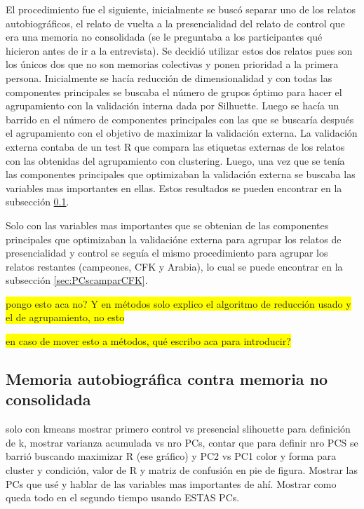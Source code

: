 El procedimiento fue el siguiente, inicialmente se buscó separar uno de los relatos autobiográficos, el relato de vuelta a la presencialidad del relato de control que era una memoria no consolidada (se le preguntaba a los participantes qué hicieron antes de ir a la entrevista). Se decidió utilizar estos dos relatos pues son los únicos dos que no son memorias colectivas y ponen prioridad a la primera persona. 
Inicialmente se hacía reducción de dimensionalidad y con todas las componentes principales se buscaba el número de grupos óptimo para hacer el agrupamiento con la validación interna dada por Silhuette. Luego se hacía un barrido en el número de componentes principales con las que se buscaría después el agrupamiento con el objetivo de maximizar la validación externa. La validación externa contaba de un test R que compara las etiquetas externas de los relatos con las obtenidas del agrupamiento con clustering. Luego, una vez que se tenía las componentes principales que optimizaban la validación externa se buscaba las variables mas importantes en ellas. Estos resultados se pueden encontrar en la subsección \ref{sec:PCspresvscontrol}.

Solo con las variables mas importantes que se obtenian de las componentes principales que optimizaban la validacióne externa para agrupar los relatos de presencialidad y control se seguía el mismo procedimiento para agrupar los relatos restantes (campeones, CFK y Arabia), lo cual se puede encontrar en la subsección \ref{sec:PCscamparCFK}.

\colorbox{yellow}{pongo esto aca no? Y en métodos solo explico el algoritmo de reducción usado y el de agrupamiento, no esto}

\colorbox{yellow}{en caso de mover esto a métodos, qué escribo aca para introducir?}

\subsection{Memoria autobiográfica contra memoria no consolidada}
\label{sec:PCspresvscontrol}
solo con kmeans mostrar 
primero control vs presencial slihouette para definición de k, mostrar varianza acumulada vs nro PCs, contar que para definir nro PCS se barrió buscando maximizar R (ese gráfico) y PC2 vs PC1 color y forma para cluster y condición, valor de R y matriz de confusión en pie de figura. Mostrar las PCs que usé y hablar de las variables mas importantes de ahí. Mostrar como queda todo en el segundo tiempo usando ESTAS PCs.

